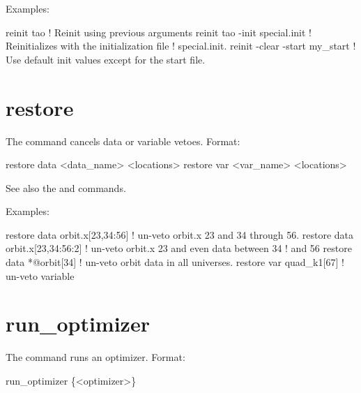 Examples:
\begin{example}
  reinit tao                         ! Reinit using previous arguments
  reinit tao -init special.init      ! Reinitializes \tao with the initialization file 
                                     !   special.init.
  reinit -clear -start my_start      ! Use default init values except for the start file.                    
\end{example}

\section{restore}
\label{s:restore}

The  command cancels data or variable vetoes. Format:
\begin{example}
  restore data  <data_name> <locations>
  restore var <var_name> <locations>
\end{example}

\vskip 10pt 

See also the  and  commands.

Examples:
\begin{example}
  restore data orbit.x[23,34:56]   ! un-veto orbit.x 23 and 34 through 56.
  restore data orbit.x[23,34:56:2] ! un-veto orbit.x 23 and even data between 34 
                                   !                                          and 56
  restore data *@orbit[34]         ! un-veto orbit data in all universes.
  restore var quad_k1[67]          ! un-veto variable
\end{example}

\section{run_optimizer}
\label{s:run}

The  command runs an optimizer. Format:
\begin{example}
  run_optimizer \{<optimizer>\}
\end{example}

\vskip 10pt 

